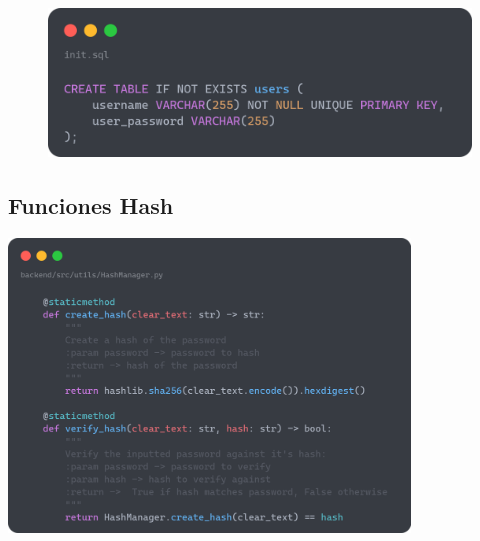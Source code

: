 \documentclass[a4paper,11pt]{article}
\begin{document}
\begin{figure}[htbp]
\begin{minipage}[t]{0.48\textwidth}
        \end{minipage}
        \vspace{0.5cm}
        \begin{minipage}[t]{0.7\textwidth} %
            \centering
            \includegraphics[width=\textwidth]{images/users.png}
        \end{minipage}
    \end{figure}


\subsection{Funciones Hash}
    \label{sec:funcionesHash}
    \centering
    \includegraphics[width=0.8\textwidth]{images/HashFunctions.png} 
\end{document}
